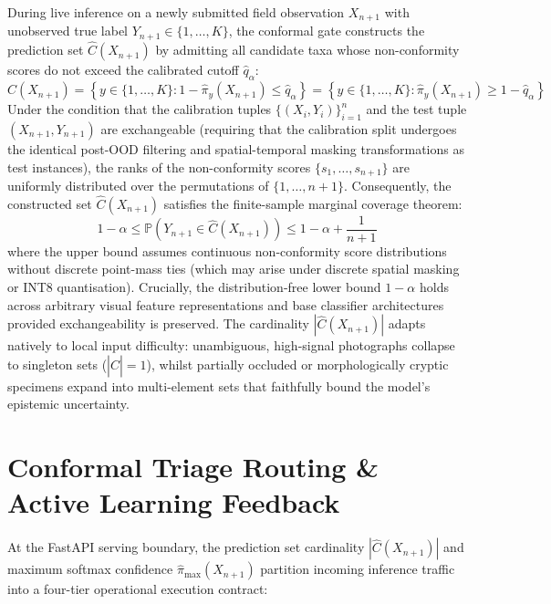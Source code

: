 During live inference on a newly submitted field observation $X_{n+1}$ with unobserved true label $Y_{n+1} \in \{1, \dots, K\}$, the conformal gate constructs the prediction set $\hat{C}(X_{n+1})$ by admitting all candidate taxa whose non-conformity scores do not exceed the calibrated cutoff $\hat{q}_\alpha$:
\begin{equation}
\hat{C}(X_{n+1}) = \left\{ y \in \{1, \dots, K\} : 1 - \hat{\pi}_y(X_{n+1}) \le \hat{q}_\alpha \right\} = \left\{ y \in \{1, \dots, K\} : \hat{\pi}_y(X_{n+1}) \ge 1 - \hat{q}_\alpha \right\}
\label{eq:conformal_set}
\end{equation}
Under the condition that the calibration tuples $\{(X_i, Y_i)\}_{i=1}^n$ and the test tuple $(X_{n+1}, Y_{n+1})$ are exchangeable (requiring that the calibration split undergoes the identical post-OOD filtering and spatial-temporal masking transformations as test instances), the ranks of the non-conformity scores $\{s_1, \dots, s_{n+1}\}$ are uniformly distributed over the permutations of $\{1, \dots, n+1\}$. Consequently, the constructed set $\hat{C}(X_{n+1})$ satisfies the finite-sample marginal coverage theorem:
\begin{equation}
1 - \alpha \le \mathbb{P}\left(Y_{n+1} \in \hat{C}(X_{n+1})\right) \le 1 - \alpha + \frac{1}{n + 1}
\label{eq:coverage_theorem}
\end{equation}
where the upper bound assumes continuous non-conformity score distributions without discrete point-mass ties (which may arise under discrete spatial masking or INT8 quantisation). Crucially, the distribution-free lower bound $1 - \alpha$ holds across arbitrary visual feature representations and base classifier architectures provided exchangeability is preserved. The cardinality $|\hat{C}(X_{n+1})|$ adapts natively to local input difficulty: unambiguous, high-signal photographs collapse to singleton sets ($|\hat{C}| = 1$), whilst partially occluded or morphologically cryptic specimens expand into multi-element sets that faithfully bound the model's epistemic uncertainty.

\section{Conformal Triage Routing \& Active Learning Feedback}
\label{sec:active_learning_triage}

At the FastAPI serving boundary, the prediction set cardinality $|\hat{C}(X_{n+1})|$ and maximum softmax confidence $\hat{\pi}_{\max}(X_{n+1})$ partition incoming inference traffic into a four-tier operational execution contract:


